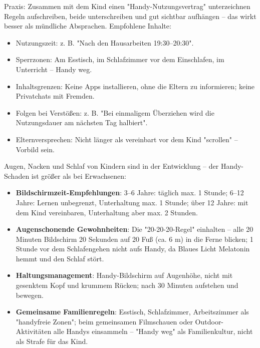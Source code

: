 \begin{tcbpractice}{Praxis: Zusammen mit dem Kind einen "Handy-Nutzungsvertrag" unterzeichnen}
Regeln aufschreiben, beide unterschreiben und gut sichtbar aufhängen – das wirkt besser als mündliche Absprachen. Empfohlene Inhalte:

\begin{itemize}
  \item Nutzungszeit: z. B. "Nach den Hausarbeiten 19:30–20:30".
  \item Sperrzonen: Am Esstisch, im Schlafzimmer vor dem Einschlafen, im Unterricht – Handy weg.
  \item Inhaltsgrenzen: Keine Apps installieren, ohne die Eltern zu informieren; keine Privatchats mit Fremden.
  \item Folgen bei Verstößen: z. B. "Bei einmaligem Überziehen wird die Nutzungsdauer am nächsten Tag halbiert".
  \item Elternversprechen: Nicht länger als vereinbart vor dem Kind "scrollen" – Vorbild sein.
\end{itemize}

\end{tcbpractice}


Augen, Nacken und Schlaf von Kindern sind in der Entwicklung – der Handy-Schaden ist größer als bei Erwachsenen:

\begin{itemize}
  \item \textbf{Bildschirmzeit-Empfehlungen}: 3–6 Jahre: täglich max. 1 Stunde; 6–12 Jahre: Lernen unbegrenzt, Unterhaltung max. 1 Stunde; über 12 Jahre: mit dem Kind vereinbaren, Unterhaltung aber max. 2 Stunden.
  \item \textbf{Augenschonende Gewohnheiten}: Die "20-20-20-Regel" einhalten – alle 20 Minuten Bildschirm 20 Sekunden auf 20 Fuß (ca. 6 m) in die Ferne blicken; 1 Stunde vor dem Schlafengehen nicht aufs Handy, da Blaues Licht Melatonin hemmt und den Schlaf stört.
  \item \textbf{Haltungsmanagement}: Handy-Bildschirm auf Augenhöhe, nicht mit gesenktem Kopf und krummem Rücken; nach 30 Minuten aufstehen und bewegen.
  \item \textbf{Gemeinsame Familienregeln}: Esstisch, Schlafzimmer, Arbeitszimmer als "handyfreie Zonen"; beim gemeinsamen Filmschauen oder Outdoor-Aktivitäten alle Handys einsammeln – "Handy weg" als Familienkultur, nicht als Strafe für das Kind.
\end{itemize}

